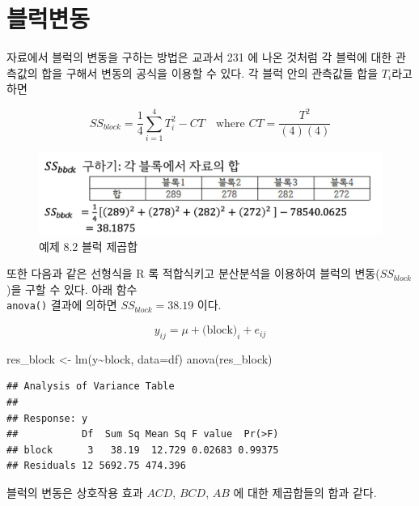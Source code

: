 \documentclass[
]{book}
\newenvironment{Shaded}{\begin{snugshade}}{\end{snugshade}}
\newcommand{\AttributeTok}[1]{\textcolor[rgb]{0.77,0.63,0.00}{#1}}
\newcommand{\FunctionTok}[1]{\textcolor[rgb]{0.00,0.00,0.00}{#1}}
\newcommand{\NormalTok}[1]{#1}
\newcommand{\OtherTok}[1]{\textcolor[rgb]{0.56,0.35,0.01}{#1}}
\newcommand{\SpecialCharTok}[1]{\textcolor[rgb]{0.00,0.00,0.00}{#1}}
\begin{document}
\hypertarget{uxbe14uxb7eduxbcc0uxb3d9}{%
\section{블럭변동}\label{uxbe14uxb7eduxbcc0uxb3d9}}

자료에서 블럭의 변동을 구하는 방법은 교과서 231 에 나온 것처럼 각 블럭에 대한 관측값의 합을 구해서 변동의 공식을 이용할 수 있다. 각 블럭 안의 관측값들 합을 \(T_i\)라고 하면

\[ SS_{block} = \frac{1}{4} \sum_{i=1}^4  T^2_i - CT \quad \text{where } CT=\frac {T^2}{(4)(4)}  \]

\begin{figure}

{\centering \includegraphics[width=0.8\linewidth]{images/ex82-block} 

}

\caption{예제 8.2 블럭 제곱합}\label{fig:unnamed-chunk-13}
\end{figure}

또한 다음과 같은 선형식을 R 록 적합식키고 분산분석을 이용하여 블럭의 변동(\(SS_{block}\))을 구할 수 있다. 아래 함수\\
\texttt{anova()} 결과에 의하면 \(SS_{block} = 38.19\) 이다.

\[ y_{ij} = \mu + \text{(block)}_i + e_{ij} \]

\begin{Shaded}
\begin{Highlighting}[]
\NormalTok{res\_block }\OtherTok{\textless{}{-}} \FunctionTok{lm}\NormalTok{(y}\SpecialCharTok{\textasciitilde{}}\NormalTok{block, }\AttributeTok{data=}\NormalTok{df)}
\FunctionTok{anova}\NormalTok{(res\_block)}
\end{Highlighting}
\end{Shaded}

\begin{verbatim}
## Analysis of Variance Table
## 
## Response: y
##           Df  Sum Sq Mean Sq F value  Pr(>F)
## block      3   38.19  12.729 0.02683 0.99375
## Residuals 12 5692.75 474.396
\end{verbatim}

블럭의 변동은 상호작용 효과 \(ACD\), \(BCD\), \(AB\) 에 대한 제곱합들의 합과 같다.
\end{document}
